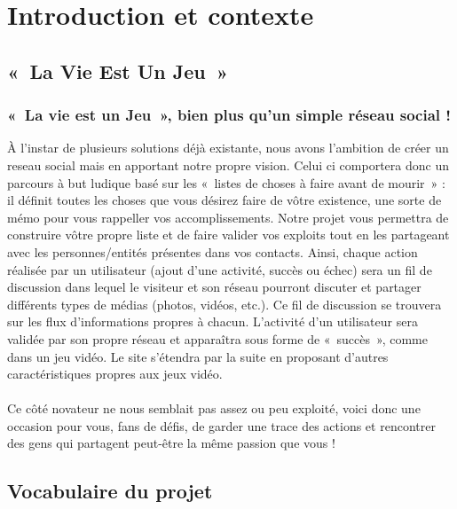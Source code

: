 \documentclass{life-fr}
\begin{document}
\newpage

\tableofcontents


\chapter{Introduction et contexte}

\section{«~La Vie Est Un Jeu~»}

\subsection{«~La vie est un Jeu~», bien plus qu'un simple réseau social !}

À l'instar de plusieurs solutions déjà existante, nous avons l'ambition de créer un reseau social mais en apportant notre propre vision.
Celui ci comportera donc un parcours à but ludique basé sur les «~listes de choses à faire avant de mourir~» : il définit toutes les choses que vous désirez faire de vôtre existence, une sorte de mémo pour vous rappeller vos accomplissements. Notre projet vous permettra de construire vôtre propre liste et de faire valider vos exploits tout en les partageant avec les personnes/entités présentes dans vos contacts. Ainsi, chaque action réalisée par un utilisateur (ajout d'une activité, succès ou échec) sera un fil de discussion dans lequel le visiteur et son réseau pourront discuter et partager différents types de médias (photos, vidéos, etc.). Ce fil de discussion se trouvera sur les flux d'informations propres à chacun. L'activité d'un utilisateur sera validée par son propre réseau et apparaîtra sous forme de «~succès~», comme dans un jeu vidéo. Le site s'étendra par la suite en proposant d'autres caractéristiques propres aux jeux vidéo.\\
\\
Ce côté novateur ne nous semblait pas assez ou peu exploité, voici donc une occasion pour vous, fans de défis, de garder une trace des actions et rencontrer des gens qui partagent peut-être la même passion que vous !


\section{Vocabulaire du projet}
\end{document}

